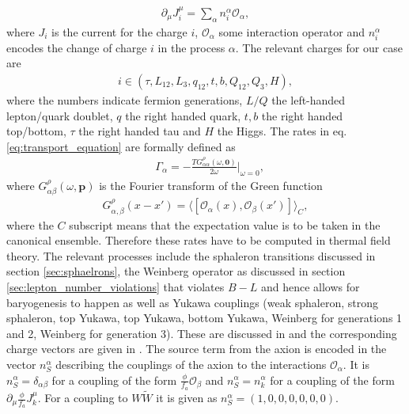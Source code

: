 \documentclass[13pt,a4paper,titlepage]{article}
\begin{document}
\begin{align}
    \partial_\mu J^\mu_i = \sum_\alpha n^\alpha_i \mathcal{O}_\alpha,
\end{align}
where $J_i$ is the current for the charge $i$, $\mathcal{O}_\alpha$ some interaction operator and
$n^\alpha_i$ encodes the change of charge $i$ in the process $\alpha$.
The relevant charges for our case are \cite[eq. 5.6]{Domcke:2020kcp_Generic_Couplings}
\begin{align}
i \in (\tau, L_{12}, L_3, q_{12}, t, b, Q_{12}, Q_3, H),
\end{align}
where the numbers indicate fermion generations, $L/Q$ the left-handed lepton/quark doublet, $q$ the right handed quark, $t,b$ the right handed top/bottom, $\tau$ the right handed tau and $H$ the Higgs.
The rates in eq. \eqref{eq:transport_equation} are formally defined as \cite[eq. B.18]{Domcke:2020kcp_Generic_Couplings}
\begin{align}
    &\Gamma_\alpha = - \frac{T G_{\alpha \alpha}^\rho(\omega, \mathbf{0})}{2\omega} \Big|_{\omega = 0},
\end{align}
where $G_{\alpha \beta}^\rho(\omega, \mathbf{p})$ is the Fourier transform of the Green function \cite[eq. B.16]{Domcke:2020kcp_Generic_Couplings}
\begin{align}
    G^\rho_{\alpha, \beta}(x - x') = \langle [\mathcal{O}_\alpha(x), \mathcal{O}_\beta(x')] \rangle_C,
\end{align}
where the $C$ subscript means that the expectation value is to be taken in the canonical ensemble.
Therefore these rates have to be computed in thermal field theory.
The relevant processes include the sphaleron transitions discussed in section \ref{sec:sphaelrons},
the Weinberg operator as discussed in section \ref{sec:lepton_number_violations} that violates $B - L$ and hence allows for baryogenesis to happen as well as
Yukawa couplings (weak sphaleron, strong sphaleron, top Yukawa, top Yukawa, bottom Yukawa, Weinberg for generations 1 and 2, Weinberg for generation 3).
These are discussed in \cite[sec. 3.1]{Domcke:2020kcp_Generic_Couplings} and the corresponding charge vectors are given in \cite[eq. 5.7]{Domcke:2020kcp_Generic_Couplings}.
The source term from the axion is encoded in the vector $n_S^\alpha$ describing the couplings of
the axion to the interactions $\mathcal{O}_\alpha$. It is $n_S^\alpha = \delta_{\alpha \beta}$ for a coupling of the form $\frac{\phi}{f_a} \mathcal{O}_\beta$
and $n_S^\alpha = n_k^\alpha$ for a coupling of the form $\partial_\mu \frac{\phi}{f_a} J^\mu_k$.
For a coupling to $W \tilde{W}$ it is given as $n_S^\alpha = (1, 0, 0, 0, 0, 0, 0)$.
\end{document}
